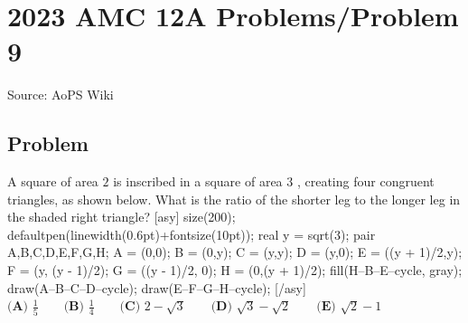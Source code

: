 \documentclass[12pt]{article}
\begin{document}
\section*{{2023 AMC 12A Problems/Problem 9}}
Source: AoPS Wiki

\subsection*{Problem}
A square of area $2$ is inscribed in a square of area $3$ , creating four congruent triangles, as shown below. What is the ratio of the shorter leg to the longer leg in the shaded right triangle? [asy] size(200); defaultpen(linewidth(0.6pt)+fontsize(10pt)); real y = sqrt(3); pair A,B,C,D,E,F,G,H; A = (0,0); B = (0,y); C = (y,y); D = (y,0); E = ((y + 1)/2,y); F = (y, (y - 1)/2); G = ((y - 1)/2, 0); H = (0,(y + 1)/2); fill(H--B--E--cycle, gray); draw(A--B--C--D--cycle); draw(E--F--G--H--cycle); [/asy] $\textbf{(A) }\frac15\qquad\textbf{(B) }\frac14\qquad\textbf{(C) }2-\sqrt3\qquad\textbf{(D) }\sqrt3-\sqrt2\qquad\textbf{(E) }\sqrt2-1$
\end{document}

